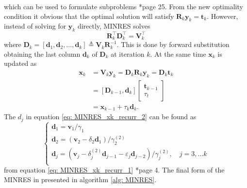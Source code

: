 which can be used to formulate subproblems \cite{ChoiSou-ChengTerrya2007Imfs}*{page 25}. From the new optimality condition it obvious that the optimal solution will satisfy $\bm{R}_k \bm{y}_k = \bm{t}_k$. However, instead of solving for $\bm{y}_k$ directly, MINRES solves
\begin{equation}\label{eq: MINRES_xk_recurr_1}
    \bm{R}_{k}^{\intercal} \bm{D}_{k}^{\intercal} = \bm{V}_{k}^{\intercal}
\end{equation}
where $\bm{D}_{k} =
    \left[ \bm{d}_1 , \bm{d}_2 , \ldots , \bm{d}_k \right] \triangleq \bm{V}_k \bm{R}_k^{-1}$. This is done by forward substitution obtaining the last column $\bm{d}_k$ of $\bm{D}_k$ at iteration $k$. At the same time $\bm{x}_k$ is updated as
\begin{align} \label{eq: MINRES_xk_recurr_2}
    \bm{x}_k & = \bm{V}_k \bm{y}_k = \bm{D}_k \bm{R}_k \bm{y}_k = \bm{D}_k \bm{t}_k \nonumber \\
             & = \left[ \bm{D}_{k-1} , \bm{d}_k \right]
    \begin{bmatrix}
        \bm{t}_{k-1} \\ \tau_{t}
    \end{bmatrix} \nonumber                                                      \\
             & = \bm{x}_{k-1} + \tau_{k} \bm{d}_{k}.
\end{align}
The $d_j$ in equation \ref{eq: MINRES_xk_recurr_2} can be found as
\begin{equation*}
    \left\{
    \begin{array}{l}
        \bm{d}_1 = \bm{v}_1 / \gamma_1                                                                                                        \\
        \bm{d}_2 = \left( \bm{v}_2 - \delta_2 \bm{d}_1 \right) / \gamma_{2}^{(2)}                                                             \\
        \bm{d}_j = \left( \bm{v}_j - \delta_j^{(2)} \bm{d}_{j-1} -\varepsilon_{j} \bm{d}_{j-2} \right) / \gamma_{j}^{(2)}, \quad j=3,\ldots k \\
    \end{array}
    \right.
\end{equation*}
from equation \ref{eq: MINRES_xk_recurr_1}  \cite{CHOISou-ChengT2011MAKS}*{page 4}. The final form of the MINRES in presented in algorithm \ref{alg: MINRES}.

